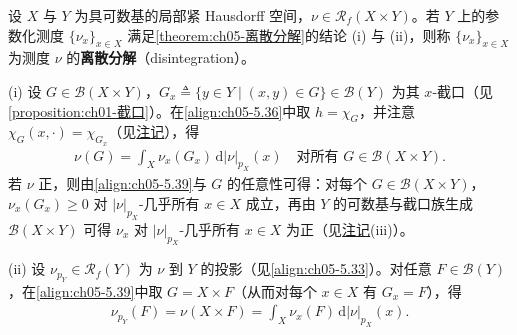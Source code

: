 \documentclass[../../main.tex]{subfiles}%
\begin{document}
\begin{definition}[离散分解]\label{definition:ch05-离散分解定义}
设 $X$ 与 $Y$ 为具可数基的局部紧 Hausdorff 空间，$\nu\in\mathscr{R}_f(X\times Y)$。若 $Y$ 上的参数化测度 $\{\nu_x\}_{x\in X}$ 满足\cref{theorem:ch05-离散分解}的结论 (i) 与 (ii)，则称 $\{\nu_x\}_{x\in X}$ 为测度 $\nu$ 的\textbf{离散分解}（disintegration）。
\end{definition}

\begin{remark}\label{remark:ch05-离散分解注}
(i) 设 $G\in\mathscr{B}(X\times Y)$，$G_x\triangleq \{y\in Y\mid(x,y)\in G\}\in\mathscr{B}(Y)$ 为其 $x$-截口（见\cref{proposition:ch01-截口}）。在\eqref{align:ch05-5.36}中取 $h=\chi_G$，并注意 $\chi_G(x,\cdot)=\chi_{G_x}$（见\hyperref[remark:ch02-截口]{注记}），得
\begin{align}
\nu(G)=\int_X\nu_x(G_x)\,\mathrm{d}|\nu|_{p_X}(x)
\quad\text{对所有 }G\in\mathscr{B}(X\times Y).\label{align:ch05-5.39}
\end{align}
若 $\nu$ 正，则由\eqref{align:ch05-5.39}与 $G$ 的任意性可得：对每个 $G\in\mathscr{B}(X\times Y)$，$\nu_x(G_x)\geqslant0$ 对 $|\nu|_{p_X}$-几乎所有 $x\in X$ 成立，再由 $Y$ 的可数基与截口族生成 $\mathscr{B}(X\times Y)$ 可得 $\nu_x$ 对 $|\nu|_{p_X}$-几乎所有 $x\in X$ 为正（见\hyperref[remark:ch05-离散分解动机]{注记}(iii)）。

(ii) 设 $\nu_{p_Y}\in\mathscr{R}_f(Y)$ 为 $\nu$ 到 $Y$ 的投影（见\eqref{align:ch05-5.33}）。对任意 $F\in\mathscr{B}(Y)$，在\eqref{align:ch05-5.39}中取 $G=X\times F$（从而对每个 $x\in X$ 有 $G_x=F$），得
\begin{align}
\nu_{p_Y}(F)=\nu(X\times F)=\int_X\nu_x(F)\,\mathrm{d}|\nu|_{p_X}(x).\label{align:ch05-5.40}
\end{align}
\end{remark}
\end{document}
